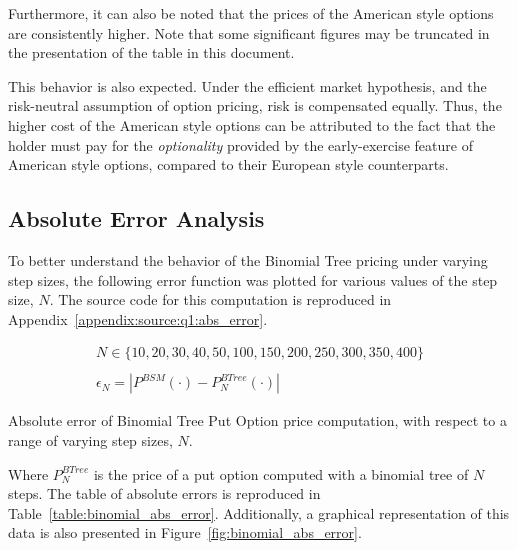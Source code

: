 \documentclass[10pt]{article}
\begin{document}
    Furthermore, it can also be noted that the prices of the American style options are consistently higher. Note that some significant figures may be truncated in the presentation of the table in this document.
    
    This behavior is also expected. Under the efficient market hypothesis, and the risk-neutral assumption of option pricing, risk is compensated equally. Thus, the higher cost of the American style options can be attributed to the fact that the holder must pay for the \textit{optionality} provided by the early-exercise feature of American style options, compared to their European style counterparts.


    \subsection{Absolute Error Analysis}
    
    To better understand the behavior of the Binomial Tree pricing under varying step sizes, the following error function was plotted for various values of the step size, $N$. The source code for this computation is reproduced in Appendix~\ref{appendix:source:q1:abs_error}.

    \begin{gather*}
        N \in \{10, 20, 30, 40, 50, 100, 150, 200, 250, 300, 350, 400\} \\
        \\
        \epsilon_N = \left| P^{BSM}(\cdot) - P^{BTree}_N(\cdot) \right|
    \end{gather*}

    \begin{table}[!h]
        \centering
        \caption{Absolute error of Binomial Tree Put Option price computation, with respect to a range of varying step sizes, $N$.}
        \label{table:binomial_abs_error}
    \end{table}

    Where $P^{BTree}_N$ is the price of a put option computed with a binomial tree of $N$ steps. The table of absolute errors is reproduced in Table~\ref{table:binomial_abs_error}. Additionally, a graphical representation of this data is also presented in Figure~\ref{fig:binomial_abs_error}.
\end{document}
